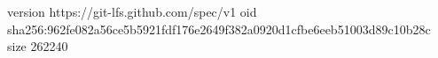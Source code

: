 version https://git-lfs.github.com/spec/v1
oid sha256:962fe082a56ce5b5921fdf176e2649f382a0920d1cfbe6eeb51003d89c10b28c
size 262240
